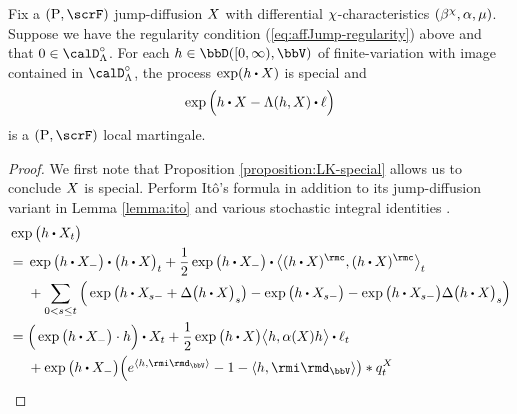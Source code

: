 \begin{theorem}
  \label{theorem:LK-exponential-martingale}
  Fix a $(\Prb, \scrF)$ jump-diffusion $X$ with differential $\chi$-characteristics $(\beta^\chi, \alpha, \mu)$.
  Suppose we have the regularity condition (\ref{eq:affJump-regularity}) above and that $0 \in \odeSpace^\circ$.
  For each $\twistFunc \in \pathSpace{[0,\infty)}{\vecSpace}$ of finite-variation with image contained in $\odeSpace^\circ$, the process $\exp(\twistFunc \shortInt \X)$ is special and 
  \[
    \exp\Big(\twistFunc \shortInt \X - \ode(\twistFunc, \X) \shortInt \leb\Big)
  \]
  is a $(\Prb, \scrF)$ local martingale.
\end{theorem}
\begin{proof}
  \label{proof:theorem:LK-exponential-martingale}
  We first note that Proposition \ref{proposition:LK-special} allows us to conclude $X$ is special.
  Perform It\^o's formula \cite[Theoerem I.4.57]{jacod2003} in addition to its jump-diffusion variant in Lemma \ref{lemma:ito} and various stochastic integral identities \cite[Remarks I.4.36, I.4.37, Theorem I.4.40(d), Proposition II.1.30(b)]{jacod2003}.
  \begin{align}
    \notag
    &\exp\big( \twistFunc \shortInt \X_t \big) \\
    \notag
    &= \begin{aligned}[t]
      &\exp\big( \twistFunc \shortInt \X_- \big) \shortInt \big( \twistFunc \shortInt \X \big)_t + \frac12 \exp\big( \twistFunc \shortInt \X_- \big) \shortInt \bprj{(\twistFunc\shortInt \X)^\rmc}{(\twistFunc\shortInt\X)^\rmc}_t \\
      &+ \sum_{0<s\leq t} \Big( \exp\big(\twistFunc \shortInt \X_{s-} + \Delta\big(\twistFunc \shortInt \X\big)_s \big) - \exp\big(\twistFunc\shortInt \X_{s-}\big) - \exp\big(\twistFunc \shortInt\X_{s-}\big) \Delta \big(\twistFunc \shortInt \X\big)_s\Big)
    \end{aligned} \\
    \notag
    &= \begin{aligned}[t]
      &\Big(\exp\big( \twistFunc \shortInt \X_- \big) \cdot \twistFunc \Big) \shortInt \X_t + \frac12 \exp\big( \twistFunc \shortInt \X \big) \bprj{\twistFunc}{\affDiff(\X)\twistFunc} \shortInt \leb_t \\
      &+ \exp\big(\twistFunc\shortInt\X_-\big) \Big( e^{\prj{\twistFunc}{\id_\vecSpace}} - 1 - \prj{\twistFunc}{\id_\vecSpace} \big) \ast \jumpMeas^\X_t
    \end{aligned} \\

\end{align}
\end{proof}
